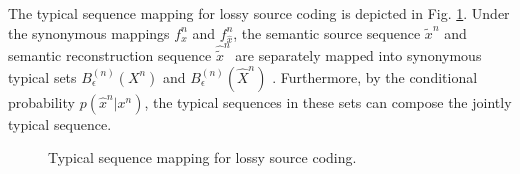 \documentclass[12pt, draftclsnofoot,onecolumn]{IEEEtran}
\begin{document}
The typical sequence mapping for lossy source coding is depicted in Fig. \ref{SemSyn_Mapping_lossy_coding}. Under the synonymous mappings $f_x^n$ and $f_{\hat{x}}^n$, the semantic source sequence $\tilde {x}^n$ and semantic reconstruction sequence $\hat{\tilde {x}}^n$ are separately mapped into synonymous typical sets $B_{\epsilon}^{(n)}(X^n)$ and $B_{\epsilon}^{(n)}(\hat{X}^n)$ . Furthermore, by the conditional probability $p(\hat{x}^n|x^n)$, the typical sequences in these sets can compose the jointly typical sequence.
\begin{figure}[htbp]
\setlength{\abovecaptionskip}{0.cm}
\setlength{\belowcaptionskip}{-0.cm}
  \caption{Typical sequence mapping for lossy source coding.}\label{SemSyn_Mapping_lossy_coding}
\end{figure}
\end{document}
